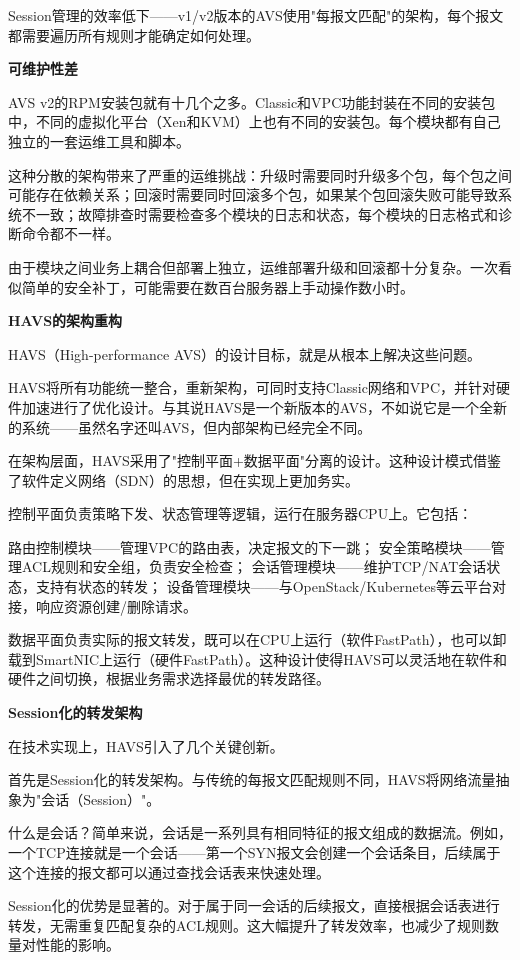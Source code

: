 Session管理的效率低下——v1/v2版本的AVS使用"每报文匹配"的架构，每个报文都需要遍历所有规则才能确定如何处理。

\textbf{可维护性差}

AVS v2的RPM安装包就有十几个之多。Classic和VPC功能封装在不同的安装包中，不同的虚拟化平台（Xen和KVM）上也有不同的安装包。每个模块都有自己独立的一套运维工具和脚本。

这种分散的架构带来了严重的运维挑战：升级时需要同时升级多个包，每个包之间可能存在依赖关系；回滚时需要同时回滚多个包，如果某个包回滚失败可能导致系统不一致；故障排查时需要检查多个模块的日志和状态，每个模块的日志格式和诊断命令都不一样。

由于模块之间业务上耦合但部署上独立，运维部署升级和回滚都十分复杂。一次看似简单的安全补丁，可能需要在数百台服务器上手动操作数小时。

\textbf{HAVS的架构重构}

HAVS（High-performance AVS）的设计目标，就是从根本上解决这些问题。

HAVS将所有功能统一整合，重新架构，可同时支持Classic网络和VPC，并针对硬件加速进行了优化设计。与其说HAVS是一个新版本的AVS，不如说它是一个全新的系统——虽然名字还叫AVS，但内部架构已经完全不同。

在架构层面，HAVS采用了"控制平面+数据平面"分离的设计。这种设计模式借鉴了软件定义网络（SDN）的思想，但在实现上更加务实。

控制平面负责策略下发、状态管理等逻辑，运行在服务器CPU上。它包括：

路由控制模块——管理VPC的路由表，决定报文的下一跳；
安全策略模块——管理ACL规则和安全组，负责安全检查；
会话管理模块——维护TCP/NAT会话状态，支持有状态的转发；
设备管理模块——与OpenStack/Kubernetes等云平台对接，响应资源创建/删除请求。

数据平面负责实际的报文转发，既可以在CPU上运行（软件FastPath），也可以卸载到SmartNIC上运行（硬件FastPath）。这种设计使得HAVS可以灵活地在软件和硬件之间切换，根据业务需求选择最优的转发路径。

\textbf{Session化的转发架构}

在技术实现上，HAVS引入了几个关键创新。

首先是Session化的转发架构。与传统的每报文匹配规则不同，HAVS将网络流量抽象为"会话（Session）"。

什么是会话？简单来说，会话是一系列具有相同特征的报文组成的数据流。例如，一个TCP连接就是一个会话——第一个SYN报文会创建一个会话条目，后续属于这个连接的报文都可以通过查找会话表来快速处理。

Session化的优势是显著的。对于属于同一会话的后续报文，直接根据会话表进行转发，无需重复匹配复杂的ACL规则。这大幅提升了转发效率，也减少了规则数量对性能的影响。


